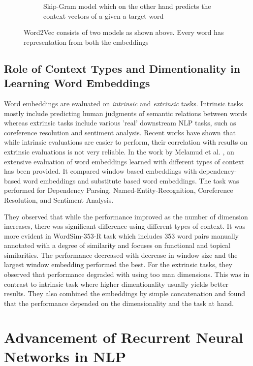 \documentclass{article}
\begin{document}
\begin{figure}
\begin{subfigure}{0.4\textwidth}
			\caption{Skip-Gram model which on the other hand predicts the context vectors of a given a target word}
		\end{subfigure}
		\caption{Word2Vec consists of two models as shown above. Every word has representation from both the embeddings}
		\label{fig:w2v}
	\end{figure}

\subsection{Role of Context Types and Dimentionality in Learning Word Embeddings}
\label{sec:embdim}

	Word embeddings are evaluated on \textit{intrinsic} and \textit{extrinsic} tasks. Intrinsic tasks mostly include predicting human judgments of semantic relations between words whereas extrinsic tasks include various 'real' downstream NLP tasks, such as coreference resolution and sentiment analysis. Recent works have shown that while intrinsic evaluations are easier to perform, their correlation with results on extrinsic evaluations is not very reliable. In the work by Melamud et al. \cite{melamud}, an extensive evaluation of word embeddings learned with different types of context has been provided. It compared window based embeddings with dependency-based word embeddings and substitute based word embeddings. The task was performed for Dependency Parsing, Named-Entity-Recognition, Coreference Resolution, and Sentiment Analysis. 
	
	They observed that while the performance improved as the number of dimension increases, there was significant difference using different types of context. It was more evident in WordSim-353-R task which includes 353 word pairs manually annotated with a degree of similarity and focuses on functional and topical similarities. The performance decreased with decrease in window size and the largest window embedding performed the best. For the extrinsic tasks, they observed that performance degraded with using too man dimensions. This was in contrast to intrinsic task where higher dimentionality usually yields better results. They also combined the embeddings by simple concatenation and found that the performance depended on the dimensionality and the task at hand. 

\section{Advancement of Recurrent Neural Networks in NLP}
\label{sec:seqnlp}
\end{document}
